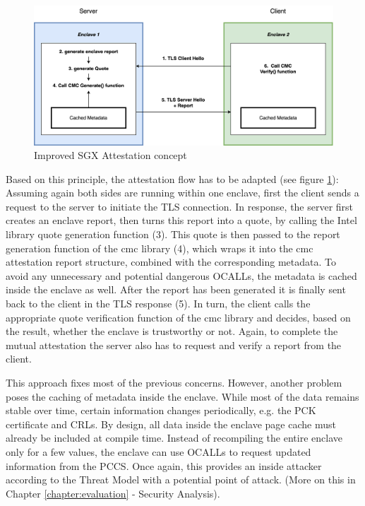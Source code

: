 \begin{figure}
	\begin{center} 
		\includegraphics[width=1.0\linewidth]{figures/cmc-sgx-concept2.drawio.png}
	\end{center}
	\caption{Improved SGX Attestation concept} 
	\label{sgx-concept-02}
\end{figure}
Based on this principle, the attestation flow has to be adapted (see figure \ref{sgx-concept-02}): 
Assuming again both sides are running within one enclave, first the client sends a request to the server to initiate the TLS connection. In response, the server first creates an enclave report, then turns this report into a quote, by calling the Intel library quote generation function (3). This quote is then passed to the report generation function of the cmc library (4), which wraps it into the cmc attestation report structure, combined with the corresponding metadata. To avoid any unnecessary and potential dangerous OCALLs, the metadata is cached inside the enclave as well. 
After the report has been generated it is finally sent back to the client in the TLS response (5). In turn, the client calls the appropriate quote verification function of the cmc library and decides, based on the result, whether the enclave is trustworthy or not. 
Again, to complete the mutual attestation the server also has to request and verify a report from the client.

This approach fixes most of the previous concerns. However, another problem poses the caching of metadata inside the enclave. While most of the data remains stable over time, certain information changes periodically, e.g. the PCK certificate and CRLs. By design, all data inside the enclave page cache must already be included at compile time. Instead of recompiling the entire enclave only for a few values, the enclave can use OCALLs to request updated information from the PCCS. Once again, this provides an inside attacker according to the Threat Model with a potential point of attack. (More on this in Chapter \ref{chapter:evaluation} - Security Analysis).

